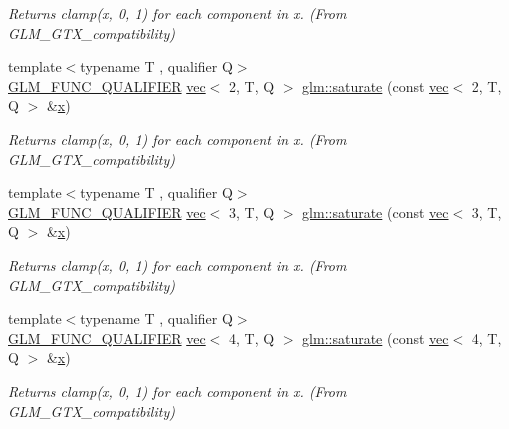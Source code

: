 \begin{DoxyCompactItemize}
\begin{DoxyCompactList}\small\item\em Returns clamp(x, 0, 1) for each component in x. (From G\+L\+M\+\_\+\+G\+T\+X\+\_\+compatibility) \end{DoxyCompactList}\item 
{\footnotesize template$<$typename T , qualifier Q$>$ }\\\hyperlink{setup_8hpp_a33fdea6f91c5f834105f7415e2a64407}{G\+L\+M\+\_\+\+F\+U\+N\+C\+\_\+\+Q\+U\+A\+L\+I\+F\+I\+ER} \hyperlink{structglm_1_1vec}{vec}$<$ 2, T, Q $>$ \hyperlink{group__gtx__compatibility_gaee97b8001c794a78a44f5d59f62a8aba}{glm\+::saturate} (const \hyperlink{structglm_1_1vec}{vec}$<$ 2, T, Q $>$ \&\hyperlink{_s_d_l__opengl_8h_ad0e63d0edcdbd3d79554076bf309fd47}{x})
\begin{DoxyCompactList}\small\item\em Returns clamp(x, 0, 1) for each component in x. (From G\+L\+M\+\_\+\+G\+T\+X\+\_\+compatibility) \end{DoxyCompactList}\item 
{\footnotesize template$<$typename T , qualifier Q$>$ }\\\hyperlink{setup_8hpp_a33fdea6f91c5f834105f7415e2a64407}{G\+L\+M\+\_\+\+F\+U\+N\+C\+\_\+\+Q\+U\+A\+L\+I\+F\+I\+ER} \hyperlink{structglm_1_1vec}{vec}$<$ 3, T, Q $>$ \hyperlink{group__gtx__compatibility_ga39bfe3a421286ee31680d45c31ccc161}{glm\+::saturate} (const \hyperlink{structglm_1_1vec}{vec}$<$ 3, T, Q $>$ \&\hyperlink{_s_d_l__opengl_8h_ad0e63d0edcdbd3d79554076bf309fd47}{x})
\begin{DoxyCompactList}\small\item\em Returns clamp(x, 0, 1) for each component in x. (From G\+L\+M\+\_\+\+G\+T\+X\+\_\+compatibility) \end{DoxyCompactList}\item 
{\footnotesize template$<$typename T , qualifier Q$>$ }\\\hyperlink{setup_8hpp_a33fdea6f91c5f834105f7415e2a64407}{G\+L\+M\+\_\+\+F\+U\+N\+C\+\_\+\+Q\+U\+A\+L\+I\+F\+I\+ER} \hyperlink{structglm_1_1vec}{vec}$<$ 4, T, Q $>$ \hyperlink{group__gtx__compatibility_ga356f8c3a7e7d6376d3d4b0a026407183}{glm\+::saturate} (const \hyperlink{structglm_1_1vec}{vec}$<$ 4, T, Q $>$ \&\hyperlink{_s_d_l__opengl_8h_ad0e63d0edcdbd3d79554076bf309fd47}{x})
\begin{DoxyCompactList}\small\item\em Returns clamp(x, 0, 1) for each component in x. (From G\+L\+M\+\_\+\+G\+T\+X\+\_\+compatibility) \end{DoxyCompactList}\item 

\end{DoxyCompactItemize}
